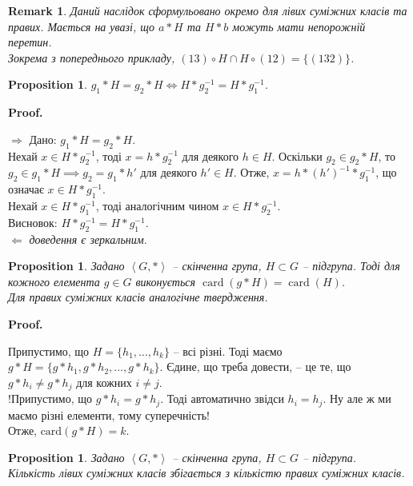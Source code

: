\documentclass[a4paper, 10pt]{article}
\makeatletter
\def\rightproof{$\boxed{\Rightarrow}$ }
\def\leftproof{$\boxed{\Leftarrow}$ }
\theoremstyle{theoremdd}
\theoremstyle{theoremdd}
\theoremstyle{theoremdd}
\theoremstyle{theoremdd}
\theoremstyle{theoremdd}
\theoremstyle{theoremdd}
\theoremstyle{theoremdd}
\theoremstyle{theoremdd}
\theoremstyle{theoremdd}
\newtheorem{proposition}[theorem]{Proposition}
\theoremstyle{theoremdd}
\theoremstyle{theoremdd}
\newtheorem{remark}[theorem]{Remark}
\theoremstyle{theoremdd}
\theoremstyle{theoremdd}
\theoremstyle{theoremdd}
\theoremstyle{theoremdd}
\renewenvironment{proof}[1][Proof.\\]{\par
\pushQED{\hfill \qed}%
\normalfont \topsep6\p@\@plus6\p@\relax
\trivlist
\item\relax
{\bfseries
#1\@addpunct{.}}\hspace\labelsep\ignorespaces
}{%
\popQED\endtrivlist\@endpefalse
}
\DeclareMathOperator{\card}{card}
\makeatother
\begin{document}
\begin{remark}
Даний наслідок сформульовано окремо для лівих суміжних класів та правих. Мається на увазі, що $a*H$ та $H*b$ можуть мати непорожній перетин.\\
Зокрема з попереднього прикладу, $(13) \circ H \cap H \circ (12) = \{(132)\}$.
\end{remark}

\begin{proposition}
$g_1 * H = g_2 * H \iff H * g_2^{-1} = H * g_1^{-1}$.
\end{proposition}

\begin{proof}
\rightproof Дано: $g_1 * H = g_2 * H$.\\
Нехай $x \in H*g_2^{-1}$, тоді $x = h*g_2^{-1}$ для деякого $h \in H$. Оскільки $g_2 \in g_2*H$, то $g_2 \in g_1*H \implies g_2 = g_1*h'$ для деякого $h' \in H$. Отже, $x = h*(h')^{-1}*g_1^{-1}$, що означає $x \in H*g_1^{-1}$.\\
Нехай $x \in H*g_1^{-1}$, тоді аналогічним чином $x \in H*g_2^{-1}$.\\
Висновок: $H*g_2^{-1} = H*g_1^{-1}$.
\bigskip \\
\leftproof \textit{доведення є зеркальним}.
\end{proof}

\begin{proposition}
\label{card_g_times_H_equals_card_H}
Задано $\left<G,* \right>$ -- скінченна група, $H \subset G$ -- підгрупа. Тоді для кожного елемента $g \in G$ виконується $\card(g*H) = \card(H)$.\\
\textit{Для правих суміжних класів аналогічне твердження}.
\end{proposition}

\begin{proof}
Припустимо, що $H = \{h_1,\dots,h_k\}$ -- всі різні. Тоді маємо $g*H = \{g*h_1,g*h_2,\dots,g*h_k\}$.  Єдине, що треба довести, -- це те, що $g*h_i \neq g*h_j$ для кожних $i \neq j$.\\
!Припустимо, що $g*h_i = g*h_j$. Тоді автоматично звідси $h_i = h_j$. Ну але ж ми маємо різні елементи, тому суперечність!\\
Отже, $\text{card}(g*H) = k$.
\end{proof}

\begin{proposition}
Задано $\left< G, * \right>$ -- скінченна група, $H \subset G$ -- підгрупа.\\
Кількість лівих суміжних класів збігається з кількістю правих суміжних класів.
\end{proposition}
\end{document}
